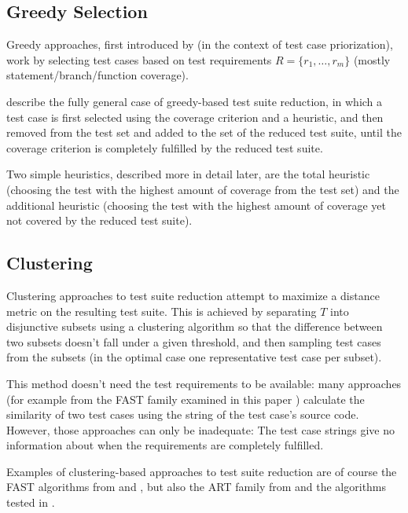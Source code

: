 \subsection{Greedy Selection}

Greedy approaches, first introduced by \cite{rothermel2001prioritizing}
(in the context of test case priorization), work by selecting test
cases based on test requirements $R=\{r_1, \dots, r_{m}\}$ (mostly
statement/branch/function coverage).

\cite{khan2018systematic} describe the fully general case of greedy-based
test suite reduction, in which a test case is first selected using
the coverage criterion and a heuristic, and then removed from the test
set and added to the set of the reduced test suite, until the coverage
criterion is completely fulfilled by the reduced test suite.

Two simple heuristics, described more in detail later, are the total
heuristic (choosing the test with the highest amount of coverage from
the test set) and the additional heuristic (choosing the test with the
highest amount of coverage yet not covered by the reduced test suite).


\subsection{Clustering}

Clustering approaches to test suite reduction attempt to maximize
a distance metric on the resulting test suite. This is achieved by
separating $T$ into disjunctive subsets using a clustering algorithm
so that the difference between two subsets doesn't fall under a given %
threshold, and then sampling test cases from the subsets (in the optimal
case one representative test case per subset).

This method doesn't need the test requirements to be available: many
approaches (for example from the FAST family examined in this paper
\cite{miranda2018fast}) calculate the similarity of two test cases using
the string of the test case's source code. However, those approaches can
only be inadequate: The test case strings give no information about when
the requirements are completely fulfilled.

Examples of clustering-based approaches to test suite reduction are
of course the FAST algorithms from \cite{cruciani2019scalable}
and \cite{miranda2018fast}, but also the ART family from
\cite{chen2010adaptive} and the algorithms tested in
\cite{hemmati2010achieving}.

